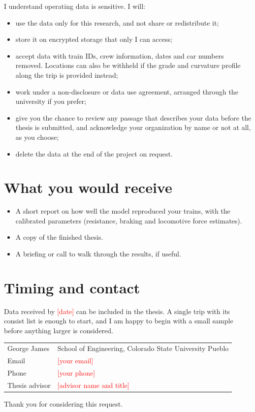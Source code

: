 \documentclass[11pt]{article}
\newcommand{\authorname}{George James}
\newcommand{\authoraffil}{School of Engineering, Colorado State University Pueblo}
\newcommand{\contactemail}{\textcolor{red}{[your email]}}
\newcommand{\contactphone}{\textcolor{red}{[your phone]}}
\newcommand{\advisor}{\textcolor{red}{[advisor name and title]}}
\newcommand{\recipient}{your organization}   %
\newcommand{\usefulby}{\textcolor{red}{[date]}}
\begin{document}
I understand operating data is sensitive. I will:
\begin{itemize}
  \item use the data only for this research, and not share or redistribute
    it;
  \item store it on encrypted storage that only I can access;
  \item accept data with train IDs, crew information, dates and car numbers
    removed. Locations can also be withheld if the grade and curvature
    profile along the trip is provided instead;
  \item work under a non-disclosure or data use agreement, arranged through
    the university if you prefer;
  \item give you the chance to review any passage that describes your data
    before the thesis is submitted, and acknowledge \recipient{} by name or
    not at all, as you choose;
  \item delete the data at the end of the project on request.
\end{itemize}

\section*{What you would receive}

\begin{itemize}
  \item A short report on how well the model reproduced your trains, with the
    calibrated parameters (resistance, braking and locomotive force
    estimates).
  \item A copy of the finished thesis.
  \item A briefing or call to walk through the results, if useful.
\end{itemize}

\section*{Timing and contact}

Data received by \usefulby{} can be included in the thesis. A single trip
with its consist list is enough to start, and I am happy to begin with a
small sample before anything larger is considered.

\medskip
\begin{tabular}{@{}l l@{}}
\authorname & \authoraffil \\
Email & \contactemail \\
Phone & \contactphone \\
Thesis advisor & \advisor \\
\end{tabular}

\medskip
Thank you for considering this request.
\end{document}

